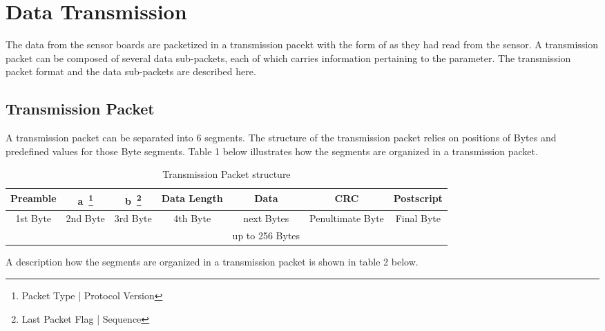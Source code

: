 \newpage
\section{Data Transmission} \label{section:overall}

The data from the sensor boards are packetized in a transmission pacekt with the form of as they had read from the sensor. A transmission packet can be composed of several data sub-packets, each of which carries information pertaining to the parameter.
The transmission packet format and the data sub-packets are described here.

\subsection{Transmission Packet}
A transmission packet can be separated into 6 segments.
The structure of the transmission packet relies on positions of Bytes and predefined values for those Byte segments. 
Table 1 below illustrates how the segments are organized in a transmission packet.
\\

\begin{table}[h!]
\begin{minipage}{\textwidth}
    \centering
    \caption{Transmission Packet structure}
    \label{table:tran}
    \begin{tabular}{|c|c|c|c|c|c|c|}
        \hline
        \rowcolor{black!8}
        \textbf{Preamble} & \textbf{a~\footnote{Packet Type | Protocol Version}} & \textbf{b~\footnote{Last Packet Flag | Sequence}} & \textbf{Data Length} & \textbf{Data} & \textbf{CRC} & \textbf{Postscript}\\
        \hline
        \multirow{2}{*}{1st Byte} & \multirow{2}{*}{2nd Byte} & \multirow{2}{*}{3rd Byte} & \multirow{2}{*}{4th Byte} & next Bytes & \multirow{2}{*}{Penultimate Byte} & \multirow{2}{*}{Final Byte} \\ 
        & & & & up to 256 Bytes & & \\ \hline
    \end{tabular}
\end{minipage}
\end{table}

A description how the segments are organized in a transmission packet is shown in table 2 below.

